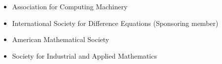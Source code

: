 \documentclass[overlapped,line,letterpaper]{res}
\begin{document}
\begin{resume}
\begin{itemize}
\item Association for Computing Machinery
\item International Society for Difference Equations (Sponsoring member)
\item American Mathematical Society
\item Society for Industrial and Applied Mathematics
\end{itemize}





\end{resume}
\end{document}
